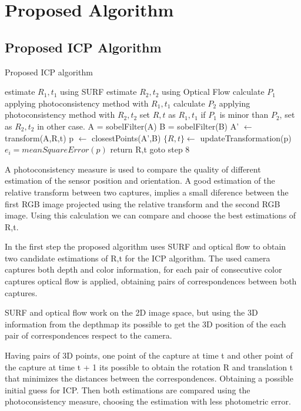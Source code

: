 \section{Proposed Algorithm}

\subsection{Proposed ICP Algorithm}

\begin{algorithm}
\caption{Proposed ICP algorithm}
\begin{algorithmic}[1]
\State estimate $R_1,t_1$ using SURF
\State estimate $R_2,t_2$ using Optical Flow
\State calculate $P_1$ applying photoconsistency method with $R_1,t_1$
\State calculate $P_2$ applying photoconsistency method with $R_2,t_2$
\State set $R,t$ as $R_1,t_1$ if $P_1$ is minor than $P_2$, set as $R_2,t_2$ in other case.
\State A = sobelFilter(A)
\State B = sobelFilter(B)
\State A' $\leftarrow$ transform(A,R,t) 
\State p $\leftarrow$ closestPoints(A',B)
\State $\{R,t\} \gets$ updateTransformation(p)
\State $e_i = meanSquareError(p)$
	\State return R,t
\Else
	\State goto step 8
\EndIf
\end{algorithmic}
\end{algorithm}


A photoconsistency measure is used to compare the quality of different estimation of the sensor
 position and orientation. A good estimation of the relative transform between two captures, implies 
a small diference between the first RGB image projected using the relative transform and the second RGB 
image. Using this calculation we can compare and choose the best estimations of R,t.

In the first step the proposed algorithm uses SURF and optical flow to obtain two candidate estimations of 
R,t for the ICP algorithm. The used camera captures both depth and color 
information, for each pair of consecutive color captures optical flow 
is applied, obtaining pairs of correspondences between both captures. 

SURF and optical flow work on the 2D image space, but using 
the 3D information from the depthmap its possible to get the 3D position 
of the each pair of correspondences respect to the camera. 

Having pairs of 3D points, one point of the capture at time t and other point 
of the capture at time t + 1 its possible to obtain the rotation R and translation t
 that minimizes the distances between the correspondences. Obtaining a possible initial guess 
 for ICP. Then both estimations are compared using the photoconsistency measure, choosing 
the estimation with less photometric error.


